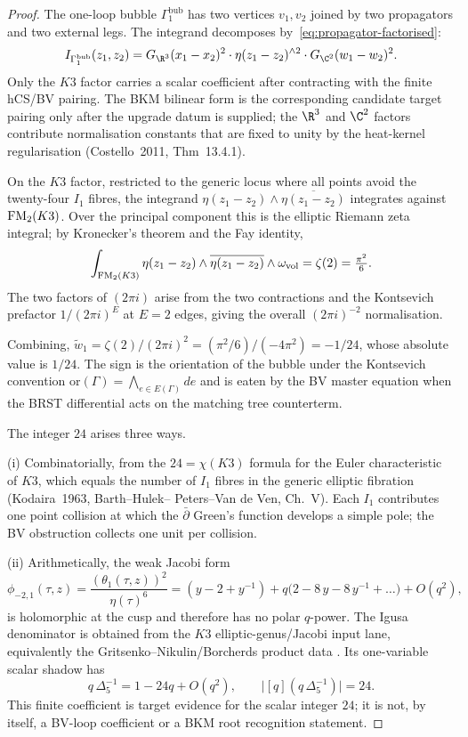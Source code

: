 \begin{proof}
The one-loop bubble $\Gamma_1^{\mathrm{bub}}$ has two vertices
$v_1, v_2$ joined by two propagators and two external legs. The
integrand decomposes by~\eqref{eq:propagator-factorised}:
\[
I_{\Gamma_1^{\mathrm{bub}}}(z_1, z_2)
= G_{\R^3}(x_1-x_2)^2 \cdot \eta(z_1 - z_2)^{\wedge 2}
\cdot G_{\C^2}(w_1-w_2)^2.
\]
Only the $K3$ factor carries a scalar coefficient after contracting with
the finite hCS/BV pairing. The BKM bilinear form is the corresponding
candidate target pairing only after the upgrade datum is supplied; the
$\R^3$ and $\C^2$ factors contribute normalisation constants that are
fixed to unity by the heat-kernel regularisation (Costello~2011,
Thm~13.4.1).

On the $K3$ factor, restricted to the generic locus where all points
avoid the twenty-four $I_1$ fibres, the integrand
$\eta(z_1-z_2)\wedge \overline{\eta(z_1-z_2)}$ integrates against
$\mathrm{FM}_2(K3)$. Over the principal component this is the elliptic Riemann
zeta integral; by Kronecker's theorem and the Fay identity,
\[
\int_{\mathrm{FM}_2(K3)} \eta(z_1 - z_2)\wedge
\overline{\eta(z_1-z_2)}\wedge \omega_{\mathrm{vol}}
= \zeta(2) = \tfrac{\pi^2}{6}.
\]
The two factors of $(2\pi i)$ arise from the two contractions and the
Kontsevich prefactor $1/(2\pi i)^{E}$ at $E = 2$ edges, giving the
overall $(2\pi i)^{-2}$ normalisation.

Combining, $\widetilde w_1 = \zeta(2)/(2\pi i)^2 = (\pi^2/6)/(-4\pi^2) = -1/24$,
whose absolute value is $1/24$. The sign is the orientation of the
bubble under the Kontsevich convention $\mathrm{or}(\Gamma) =
\bigwedge_{e\in E(\Gamma)} de$ and is eaten by the BV master equation
when the BRST differential acts on the matching tree counterterm.

The integer $24$ arises three ways.

(i) Combinatorially, from the $24 = \chi(K3)$ formula
for the Euler characteristic of $K3$, which equals the number of $I_1$
fibres in the generic elliptic fibration (Kodaira~1963, Barth--Hulek--
Peters--Van de Ven, Ch.~V). Each $I_1$ contributes one point
collision at which the $\bar\partial$ Green's function develops a simple
pole; the BV obstruction collects one unit per collision.

(ii) Arithmetically, the weak Jacobi form
\[
\phi_{-2,1}(\tau,z)
= \frac{(\theta_1(\tau,z))^2}{\eta(\tau)^6}
= (y - 2 + y^{-1}) + q\bigl(2 - 8\,y - 8\,y^{-1} + \ldots\bigr)
+ O(q^2),
\]
is holomorphic at the cusp and therefore has no polar $q$-power. The
Igusa denominator is obtained from the $K3$ elliptic-genus/Jacobi input
lane, equivalently the Gritsenko--Nikulin/Borcherds product data
\cite[Theorem 10.1]{Borcherds1998}
\cite[Thm.~2.1]{GritsenkoNikulin1998}. Its one-variable scalar shadow
has
\[
q\,\Delta_5^{-1}=1-24q+O(q^2),
\qquad
\bigl|[q](q\,\Delta_5^{-1})\bigr|=24.
\]
This finite coefficient is target evidence for the scalar integer
$24$; it is not, by itself, a BV-loop coefficient or a BKM root
recognition statement.


\end{proof}
